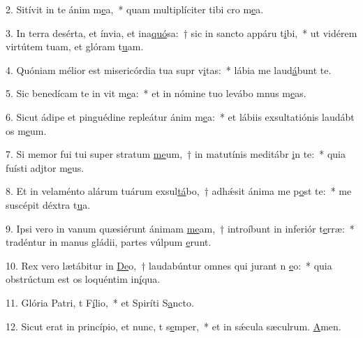 2. Sitívit in te ánim m\uline{e}a,~* quam multiplíciter tibi cro m\uline{e}a.\par 
3. In terra desérta, et ínvia, et ina\uline{quó}sa:~† sic in sancto appáru t\uline{i}bi,~* ut vidérem virtútem tuam, et glóram t\uline{u}am.\par 
4. Quóniam mélior est misericórdia tua supr v\uline{i}tas:~* lábia me laud\uline{á}bunt te.\par 
5. Sic benedícam te in vit m\uline{e}a:~* et in nómine tuo levábo mnus m\uline{e}as.\par 
6. Sicut ádipe et pinguédine repleátur ánim m\uline{e}a:~* et lábiis exsultatiónis laudábt os m\uline{e}um.\par 
7. Si memor fui tui super stratum \uline{me}um,~† in matutínis meditábr \uline{i}n te:~* quia fuísti adjtor m\uline{e}us.\par 
8. Et in velaménto alárum tuárum exsul\uline{tá}bo,~† adhǽsit ánima me p\uline{o}st te:~* me suscépit déxtra t\uline{u}a.\par 
9. Ipsi vero in vanum quæsiérunt ánimam \uline{me}am,~† introíbunt in inferiór t\uline{e}rræ:~* tradéntur in manus gládii, partes vúlpum \uline{e}runt.\par 
10. Rex vero lætábitur in \uline{De}o,~† laudabúntur omnes qui jurant n \uline{e}o:~* quia obstrúctum est os loquéntim in\uline{í}qua.\par 
11. Glória Patri, t F\uline{í}lio,~* et Spiríti S\uline{a}ncto.\par 
12. Sicut erat in princípio, et nunc, t s\uline{e}mper,~* et in sǽcula sæculrum. \uline{A}men.\par 
